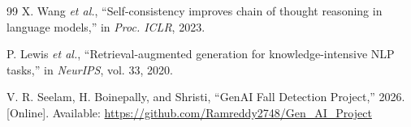 \documentclass[conference]{IEEEtran}
\begin{document}
\begin{thebibliography}{99}
X. Wang \textit{et al.}, ``Self-consistency improves chain of thought reasoning in language models,'' in \textit{Proc. ICLR}, 2023.

P. Lewis \textit{et al.}, ``Retrieval-augmented generation for knowledge-intensive NLP tasks,'' in \textit{NeurIPS}, vol. 33, 2020.

V. R. Seelam, H. Boinepally, and Shristi, ``GenAI Fall Detection Project,'' 2026. [Online]. Available: \url{https://github.com/Ramreddy2748/Gen_AI_Project}

\end{thebibliography}
\end{document}
